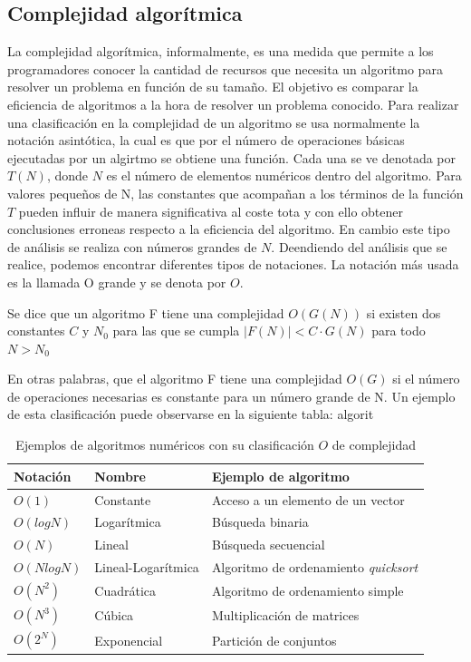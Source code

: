 \subsection{Complejidad algorítmica}
La complejidad algorítmica, informalmente, es una medida que permite a los programadores conocer la cantidad de recursos que necesita un algoritmo para resolver un problema en función de su tamaño. El objetivo es
comparar la eficiencia de algoritmos a la hora de resolver un problema conocido\cite{Cohen1998}. Para realizar una clasificación en la complejidad de un algoritmo
se usa normalmente la notación asintótica, la cual es que por el número de operaciones básicas ejecutadas por un algirtmo se obtiene una función. Cada
una se ve denotada por $T(N)$, donde $N$ es el número de elementos numéricos dentro del algoritmo. Para valores pequeños de N, las constantes 
que acompañan a los términos de la función $T$ pueden influir de manera significativa al coste tota y con ello obtener conclusiones erroneas respecto
a la eficiencia del algoritmo. En cambio este tipo de análisis se realiza con números grandes de $N$. Deendiendo del análisis que se realice, podemos
encontrar diferentes tipos de notaciones. La notación más usada es la llamada O grande y se denota por $O$.
\begin{defi}
Se dice que un algoritmo F tiene una complejidad $O(G(N))$ si existen dos constantes $C$ y $N_0$ para las que se cumpla $|F(N)|<C\cdot G(N)$ para todo
$N>N_0$
\end{defi}
En otras palabras, que el algoritmo F tiene una complejidad $O(G)$ si el número de operaciones necesarias es constante para un número grande de N. Un ejemplo
de esta clasificación puede observarse en la siguiente tabla: algorit
\begin{table}[H]
    \centering
    \begin{tabular}{lll}
        \hline
        Notación & Nombre & Ejemplo de algoritmo \\
        \hline
        $O(1)$ & Constante & Acceso a un elemento de un vector\\ 
        $O(log N)$ & Logarítmica& Búsqueda binaria\\
        $O(N)$ & Lineal & Búsqueda secuencial\\
        $O(N log N)$ & Lineal-Logarítmica& Algoritmo de ordenamiento \textit{quicksort}\\
        $O(N^2)$ &Cuadrática & Algoritmo de ordenamiento simple\\
        $O(N^3)$ &Cúbica & Multiplicación de matrices\\
        $O(2^N)$ &Exponencial & Partición de conjuntos\\ \hline
    \end{tabular}
    \caption{Ejemplos de algoritmos numéricos con su clasificación $O$ de complejidad}
    \label{tabla:notacion-O}
\end{table}
